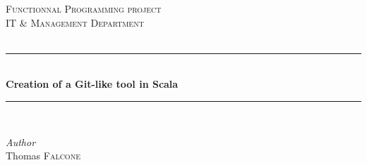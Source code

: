 
\begin{titlepage} %
  \newcommand{\HRule}{\rule{\linewidth}{0.5mm}} %

	\center %


	\textsc{\LARGE Functionnal Programming project}\\[0.3cm] %

	\textsc{\Large IT \& Management Department}\\[0.5cm] %

	\textsc{\large }\\[0.5cm] %

	\HRule\\[0.4cm]
	{\huge\bfseries Creation of a Git-like tool in Scala}\\ %
	\HRule\\[1.5cm]

	\begin{minipage}{0.4\textwidth}
		\begin{center}
			\large
			\textit{Author}\\[0.2cm]
			Thomas \textsc{Falcone} %
		\end{center}
	\end{minipage}
	~



	\vfill\vfill\vfill %


\end{titlepage}
